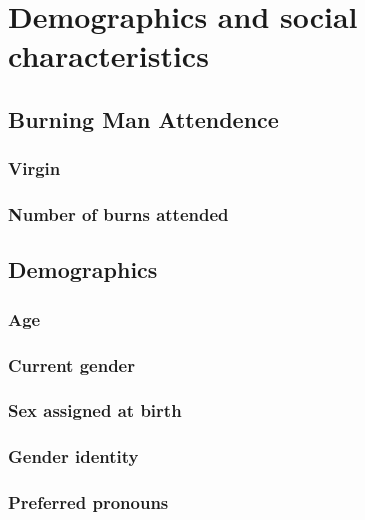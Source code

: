 \documentclass[
]{book}
\begin{document}
\hypertarget{sociodemo}{%
\chapter{Demographics and social characteristics}\label{sociodemo}}

\hypertarget{burning-man-attendence}{%
\section{Burning Man Attendence}\label{burning-man-attendence}}

\hypertarget{virgin}{%
\subsection{Virgin}\label{virgin}}

\hypertarget{number-of-burns-attended}{%
\subsection{Number of burns attended}\label{number-of-burns-attended}}

\hypertarget{demographics}{%
\section{Demographics}\label{demographics}}

\hypertarget{age}{%
\subsection{Age}\label{age}}

\hypertarget{current-gender}{%
\subsection{Current gender}\label{current-gender}}

\hypertarget{sex-assigned-at-birth}{%
\subsection{Sex assigned at birth}\label{sex-assigned-at-birth}}

\hypertarget{gender-identity}{%
\subsection{Gender identity}\label{gender-identity}}

\hypertarget{preferred-pronouns}{%
\subsection{Preferred pronouns}\label{preferred-pronouns}}
\end{document}
